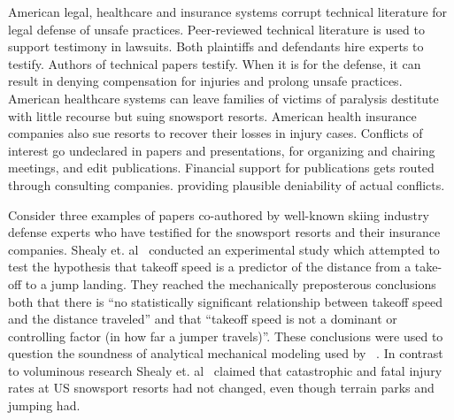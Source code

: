 \documentclass[smallextended]{svjour3}       %
\begin{document}

American legal, healthcare and insurance systems corrupt technical literature for legal defense of unsafe practices. Peer-reviewed technical literature is used to support testimony in lawsuits. Both plaintiffs and defendants hire experts to testify. Authors of technical papers testify. When it is for the defense, it can result in denying compensation for injuries and prolong unsafe practices. American healthcare systems can leave families of victims of paralysis destitute with little recourse but suing snowsport resorts.  American health insurance companies also sue resorts to recover their losses in injury cases. Conflicts of interest go undeclared in papers and presentations, for organizing and chairing meetings, and edit publications. Financial support for publications gets routed through consulting companies. providing plausible deniability of actual conflicts. 


 Consider three examples of papers
co-authored by well-known skiing industry defense experts who have testified
for the snowsport resorts and their insurance companies. Shealy et. al~\cite{Shealy2010} conducted an experimental study which attempted
to test the hypothesis that takeoff speed is a predictor of the distance from a
take-off to a jump landing. They reached the mechanically preposterous conclusions both that there is ``no statistically significant relationship between takeoff speed and the distance traveled'' and that ``takeoff speed is not a dominant or controlling factor (in how far a jumper travels)''. These conclusions were used to question the soundness of analytical mechanical modeling used by ~\cite{Hubbard2009,McNeil2012}. In contrast to voluminous research Shealy et. al~\cite{Shealy2015} claimed that catastrophic and fatal injury rates at US snowsport resorts had not changed, even though terrain parks and jumping had. 
\end{document}
